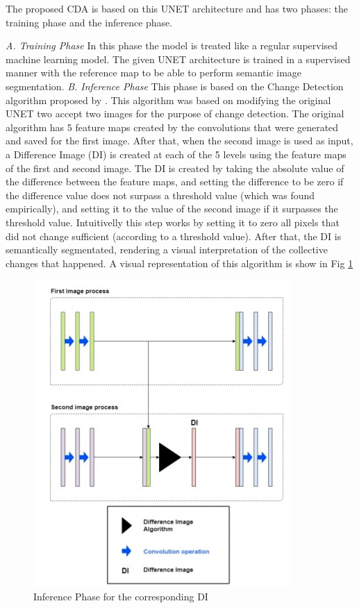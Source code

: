 The proposed CDA is based on this UNET architecture and has two phases: the training phase and the inference phase.

\textit{A. Training Phase}
\newline
In this phase the model is treated like a regular supervised machine learning model. The given UNET architecture is trained in a supervised manner with the reference map
to be able to perform semantic image segmentation. 
\newline
\textit{B. Inference Phase}
\newline
This phase is based on the Change Detection algorithm proposed by \cite{Kevin}. This algorithm was based on modifying the original UNET two accept two images for the purpose of change detection.
The original algorithm has 5 feature maps created by the convolutions that were generated and saved for the first image. After that, when the second image is used as input, a Difference Image (DI) is
created at each of the 5 levels using the feature maps of the first and second image.
The DI is created by taking the absolute value of the difference between the feature maps, and setting the difference to be zero if the difference value does not surpass a threshold value (which was found empirically), and setting it to 
the value of the second image if it surpasses the threshold value. Intuitivelly this step works by setting it to zero all pixels that did not change sufficient (according to a threshold value). After that, the DI is semantically segmentated, rendering a visual 
interpretation of the collective changes that happened. A visual representation of this algorithm is show in Fig \ref{fig:kevin_algorithm}

\begin{figure}[ht]
    \centering
    \includegraphics{Chapter7/kevin_algorithm.jpg}
    \caption{Inference Phase for the corresponding DI}
    \label{fig:kevin_algorithm}
\end{figure}


